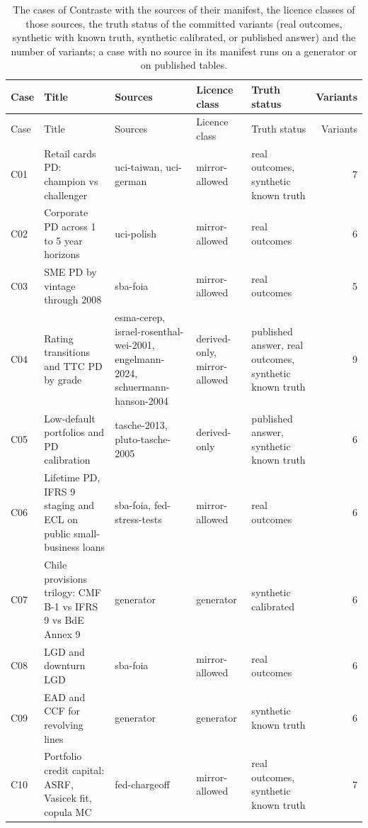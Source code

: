 {\footnotesize
\setlength{\tabcolsep}{3pt}
\renewcommand{\arraystretch}{1.12}
\begin{longtable}{l>{\raggedright\arraybackslash}p{4.0cm}>{\raggedright\arraybackslash}p{2.9cm}>{\raggedright\arraybackslash}p{2.2cm}>{\raggedright\arraybackslash}p{3.0cm}r}
\caption{The cases of Contraste with the sources of their manifest, the licence classes of those sources, the truth status of the committed variants (real outcomes, synthetic with known truth, synthetic calibrated, or published answer) and the number of variants; a case with no source in its manifest runs on a generator or on published tables.}\label{tab:data-cases}\\
\toprule
Case & Title & Sources & Licence class & Truth status & Variants \\
\midrule
\endfirsthead
\toprule
Case & Title & Sources & Licence class & Truth status & Variants \\
\midrule
\endhead
\bottomrule
\endfoot
C01 & Retail cards PD: champion vs challenger & uci-taiwan, uci-german & mirror-allowed & real outcomes, synthetic known truth & 7 \\
C02 & Corporate PD across 1 to 5 year horizons & uci-polish & mirror-allowed & real outcomes & 6 \\
C03 & SME PD by vintage through 2008 & sba-foia & mirror-allowed & real outcomes & 5 \\
C04 & Rating transitions and TTC PD by grade & esma-cerep, israel-rosenthal-wei-2001, engelmann-2024, schuermann-hanson-2004 & derived-only, mirror-allowed & published answer, real outcomes, synthetic known truth & 9 \\
C05 & Low-default portfolios and PD calibration & tasche-2013, pluto-tasche-2005 & derived-only & published answer, synthetic known truth & 6 \\
C06 & Lifetime PD, IFRS 9 staging and ECL on public small-business loans & sba-foia, fed-stress-tests & mirror-allowed & real outcomes & 6 \\
C07 & Chile provisions trilogy: CMF B-1 vs IFRS 9 vs BdE Annex 9 & generator & generator & synthetic calibrated & 6 \\
C08 & LGD and downturn LGD & sba-foia & mirror-allowed & real outcomes & 6 \\
C09 & EAD and CCF for revolving lines & generator & generator & synthetic known truth & 6 \\
C10 & Portfolio credit capital: ASRF, Vasicek fit, copula MC & fed-chargeoff & mirror-allowed & real outcomes, synthetic known truth & 7 \\

\end{longtable}}
